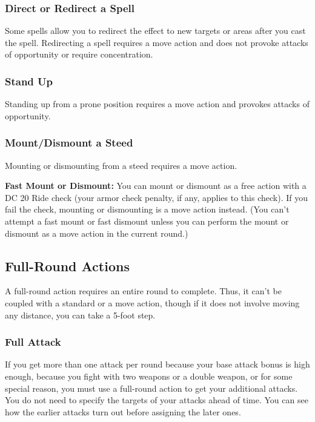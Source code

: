 \subsubsection{Direct or Redirect a Spell}

Some spells allow you to redirect the effect to new targets or areas after you cast the spell. Redirecting a spell requires a move action and does not provoke attacks of opportunity or require concentration.

\subsubsection{Stand Up}

Standing up from a prone position requires a move action and provokes attacks of opportunity.

\subsubsection{Mount/Dismount a Steed}

Mounting or dismounting from a steed requires a move action.

\textbf{Fast Mount or Dismount:} You can mount or dismount as a free action with a DC 20 Ride check (your armor check penalty, if any, applies to this check). If you fail the check, mounting or dismounting is a move action instead. (You can't attempt a fast mount or fast dismount unless you can perform the mount or dismount as a move action in the current round.)

\subsection{Full-Round Actions}

A full-round action requires an entire round to complete. Thus, it can't be coupled with a standard or a move action, though if it does not involve moving any distance, you can take a 5-foot step.

\subsubsection{Full Attack}

If you get more than one attack per round because your base attack bonus is high enough, because you fight with two weapons or a double weapon, or for some special reason, you must use a full-round action to get your additional attacks. You do not need to specify the targets of your attacks ahead of time. You can see how the earlier attacks turn out before assigning the later ones.

